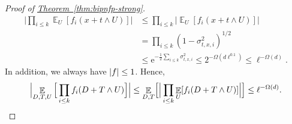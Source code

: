 \documentclass[11pt]{article}
\numberwithin{equation}{section}
\theoremstyle{definition}
\theoremstyle{plain}
\newcommand{\eee}{\mathrm e}
\newcommand{\expref}[2]{\hyperref[#2]{#1~\ref{#2}}}
\def\Blocklength{\ell}
\DeclarePairedDelimiter{\abs}{\lvert}{\rvert}
\DeclareMathOperator*{\E}{\mathbb{E}}                 %
\begin{document}
\begin{proof}[Proof of {\expref{Theorem}{thm:bipnfp-strong}}]
    \begin{align*}
      \Big| \prod_{i \le k} \E_{U}[f_i(x + t \wedge U)] \Big| 
      &\le \prod_{i \le k} \Big| \E_{U}[f_i(x + t \wedge U)] \Big| \\
      &= \prod_{i \le k} (1 - \sigma_{t,x,i}^2)^{1/2}  \\
      &\le \eee^{-\frac{1}{2} \sum_{i \le k} \sigma_{t,x,i}^2} \le 2^{-\Omega(d \Blocklength^{0.1})} \le \Blocklength^{-\Omega(d)} .
    \end{align*}
    In addition, we always have $\abs{f} \le 1$.
    Hence,
    \[
      \Bigl| \E_{D,T,U} \Big[ \prod_{i \le k} f_i(D + T \wedge U) \Big] \Bigr|
      \le \E_{D,T} \Bigl[ \Big| \prod_{i \le k} \E_U[f_i(D + T \wedge U)] \Big| \Bigr]
      \le \Blocklength^{-\Omega(d)} .
    \]

    \medskip


\end{proof}
\end{document}
